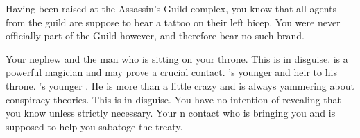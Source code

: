\documentclass[char]{NeptuneBall}
\begin{document}
\begin{itemz}[Notes]
  \item Having been raised at the Assassin's Guild complex, you know that all agents from the guild are suppose to bear a tattoo on their left bicep. You were never officially part of the Guild however, and therefore bear no such brand.
\end{itemz}

\begin{contacts}
  \contact{\cKing{}} Your nephew and the man who is sitting on your throne.
  \contact{\cWitch{\MYname}} This is \cWitch{} in disguise. \cWitch{\They} is a powerful magician and may prove a crucial contact.
  \contact{\cPrincess{}} \cKing{}'s younger \cPrincess{\offspring} and heir to his throne.
  \contact{\cPlant{}} \cKing{}'s younger \cPlant{\sibling}. He is more than a little crazy and is always yammering about conspiracy theories.
  \contact{\cQueen{\MYname}} This is \cQueen{} in disguise. You have no intention of revealing that you know \cQueen{\them} unless strictly necessary.
  \contact{\cSpy{}} Your \pPacifica{}n contact who is bringing you \iHemlock{} and is supposed to help you sabatoge the treaty.
\end{contacts}
\end{document}
